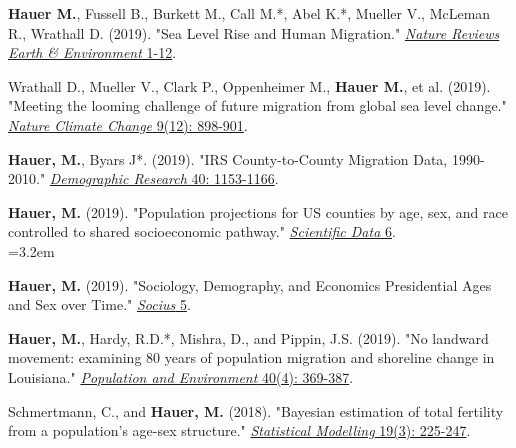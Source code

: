 \begin{etaremune}
     \item \textbf{Hauer M.}, Fussell B., Burkett M., Call M.*, Abel K.*, Mueller V., McLeman R., Wrathall D. (2019). "Sea Level Rise and Human Migration." \href{https://www.nature.com/articles/s43017-019-0002-9}{\textit{Nature Reviews Earth \& Environment} 1-12}.\\

    \item Wrathall D., Mueller V., Clark P., Oppenheimer M., \textbf{Hauer M.}, et al. (2019). "Meeting the looming challenge of future migration from global sea level change." \href{https://www.nature.com/articles/s41558-019-0640-4}{\textit{Nature Climate Change} 9(12): 898-901}. \\

    \item \textbf{Hauer, M.}, Byars J*. (2019). "IRS County-to-County Migration Data, 1990-2010." \href{https://www.demographic-research.org/volumes/vol40/40/default.htm}{\textit{Demographic Research} 40: 1153-1166}.

  \item \textbf{Hauer, M.} (2019). "Population projections for US counties by age, sex, and race controlled to shared socioeconomic pathway." \href{https://www.nature.com/articles/sdata20195}{\textit{Scientific Data} 6}.\\
  \hangindent=3.2em\hspace{3em}{\footnotesize * Winner of the 2018 E. Walter Terrie Award from the Southern Demographic Association.}\\

   \item \textbf{Hauer, M.} (2019). "Sociology, Demography, and Economics Presidential Ages and Sex over Time." \href{https://journals.sagepub.com/doi/abs/10.1177/2378023118825221}{\textit{Socius} 5}.

  \item \textbf{Hauer, M.}, Hardy, R.D.*, Mishra, D., and Pippin, J.S. (2019). "No landward movement: examining 80 years of population migration and shoreline change in Louisiana." \href{https://link.springer.com/article/10.1007/s11111-019-00315-8}{\textit{Population and Environment} 40(4): 369-387}.

 \item Schmertmann, C., and \textbf{Hauer, M.} (2018). "Bayesian estimation of total fertility from a population's age-sex structure." \href{https://doi.org/10.1177/1471082X18801450 }{\textit{Statistical Modelling} 19(3): 225-247}.


\end{etaremune}
